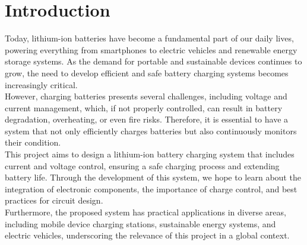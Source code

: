\section{Introduction}

Today, lithium-ion batteries have become a fundamental part of our daily lives, powering everything from smartphones to electric vehicles and renewable energy storage systems. As the demand for portable and sustainable devices continues to grow, the need to develop efficient and safe battery charging systems becomes increasingly critical.\\

However, charging batteries presents several challenges, including voltage and current management, which, if not properly controlled, can result in battery degradation, overheating, or even fire risks. Therefore, it is essential to have a system that not only efficiently charges batteries but also continuously monitors their condition.\\

This project aims to design a lithium-ion battery charging system that includes current and voltage control, ensuring a safe charging process and extending battery life. Through the development of this system, we hope to learn about the integration of electronic components, the importance of charge control, and best practices for circuit design.\\

Furthermore, the proposed system has practical applications in diverse areas, including mobile device charging stations, sustainable energy systems, and electric vehicles, underscoring the relevance of this project in a global context. 